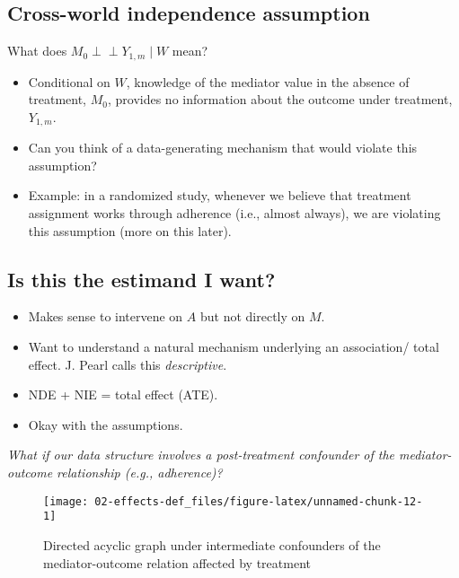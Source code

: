 \documentclass[
  12pt,
]{book}
\providecommand{\tightlist}{%
  \setlength{\itemsep}{0pt}\setlength{\parskip}{0pt}}
\theoremstyle{definition}
\theoremstyle{definition}
\theoremstyle{definition}
\newcommand{\indep}{\mbox{$\perp\!\!\!\perp$}}
\newcommand{\1}{\mathbbm{1}}
\begin{document}
\hypertarget{cross-world-independence-assumption}{%
\subsection{Cross-world independence assumption}\label{cross-world-independence-assumption}}

What does \(M_0 \indep Y_{1,m} \mid W\) mean?

\begin{itemize}
\tightlist
\item
  Conditional on \(W\), knowledge of the mediator value in the absence of treatment, \(M_0\),
  provides no information about the outcome under treatment, \(Y_{1,m}\).
\item
  Can you think of a data-generating mechanism that would violate this
  assumption?
\item
  Example: in a randomized study, whenever we believe that treatment assignment works through adherence (i.e., almost
  always), we are violating this assumption (more on this later).
\end{itemize}

\hypertarget{is-this-the-estimand-i-want-1}{%
\subsection{Is this the estimand I want?}\label{is-this-the-estimand-i-want-1}}

\begin{itemize}
\tightlist
\item
  Makes sense to intervene on \(A\) but not directly on \(M\).
\item
  Want to understand a natural mechanism underlying an association/ total
  effect. J. Pearl calls this \emph{descriptive}.
\item
  NDE + NIE = total effect (ATE).
\item
  Okay with the assumptions.
\end{itemize}

\emph{What if our data structure involves a post-treatment confounder of the
mediator-outcome relationship (e.g., adherence)?}

\begin{figure}

{\centering \texttt{[image: 02-effects-def\_files/figure-latex/unnamed-chunk-12-1]} 

}

\caption{Directed acyclic graph under intermediate confounders of the mediator-outcome relation affected by treatment}\label{fig:unnamed-chunk-12}
\end{figure}
\end{document}
